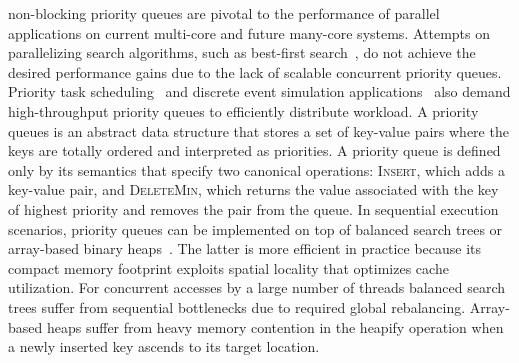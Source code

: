 \documentclass[10pt,journal,letter,compsoc]{IEEEtran}
\begin{document}
 non-blocking priority queues are pivotal to the performance of parallel applications on current multi-core and future many-core systems.
Attempts on parallelizing search algorithms, such as best-first search~\cite{burns2010best}, do not achieve the desired performance gains due to the lack of scalable concurrent priority queues.
Priority task scheduling~\cite{wimmer2013data} and discrete event simulation applications~\cite{linden2013skiplist} also demand high-throughput priority queues to efficiently distribute workload.
A priority queues is an abstract data structure that stores a set of key-value pairs where the keys are totally ordered and interpreted as priorities. 
A priority queue is defined only by its semantics that specify two canonical operations: \textsc{Insert}, which adds a key-value pair, and \textsc{DeleteMin}, which returns the value associated with the key of highest priority and removes the pair from the queue.
In sequential execution scenarios, priority queues can be implemented on top of balanced search trees or array-based binary heaps~\cite{cormen2001introduction}. 
The latter is more efficient in practice because its compact memory footprint exploits spatial locality that optimizes cache utilization. 
For concurrent accesses by a large number of threads balanced search trees suffer from sequential bottlenecks due to required global rebalancing.
Array-based heaps suffer from heavy memory contention in the heapify operation when a newly inserted key ascends to its target location.
\end{document}
